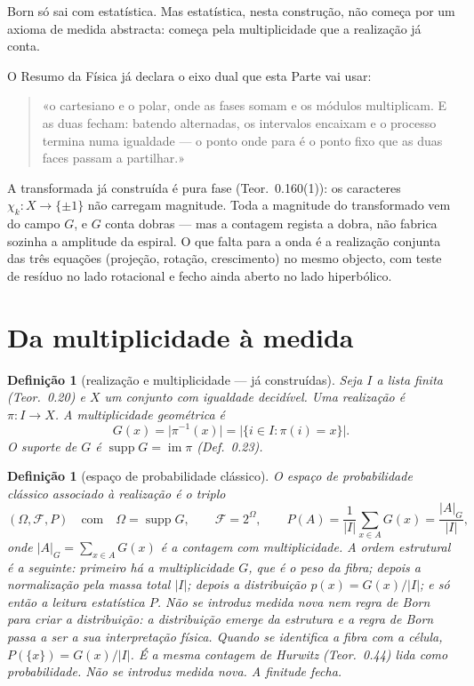 \documentclass[11pt,a4paper]{article}
\newtheorem{definicao}[teorema]{Definição}
\begin{document}
Born só sai com estatística. Mas estatística, nesta construção, não começa por um axioma
de medida abstracta: começa pela multiplicidade que a realização já conta.

O Resumo da Física já declara o eixo dual que esta Parte vai usar:

\begin{quote}
\small
«o cartesiano e o polar, onde as fases somam e os módulos multiplicam.
E as duas fecham: batendo alternadas, os intervalos encaixam e o processo termina
numa igualdade --- o ponto onde para é o ponto fixo que as duas faces passam a partilhar.»
\end{quote}

A transformada já construída é pura fase (Teor.~0.160(1)): os caracteres $\chi_k:X\to\{\pm1\}$
não carregam magnitude. Toda a magnitude do transformado vem do campo $G$, e $G$ conta
dobras --- mas a contagem regista a dobra, não fabrica sozinha a amplitude da espiral.
O que falta para a onda é a realização conjunta das três equações
(projeção, rotação, crescimento) no mesmo objecto, com teste de resíduo no lado rotacional
e fecho ainda aberto no lado hiperbólico.

\section{Da multiplicidade à medida}

\begin{definicao}[realização e multiplicidade --- já construídas]
\label{def:realizacao}
Seja $I$ a lista finita (Teor.~0.20) e $X$ um conjunto com igualdade decidível.
Uma realização é $\pi:I\to X$. A multiplicidade geométrica é
\[
G(x)=\bigl|\pi^{-1}(x)\bigr|=\bigl|\{i\in I:\pi(i)=x\}\bigr|.
\]
O suporte de $G$ é $\operatorname{supp}G=\operatorname{im}\pi$ (Def.~0.23).
\end{definicao}

\begin{definicao}[espaço de probabilidade clássico]
\label{def:espaco-prob}
O espaço de probabilidade clássico associado à realização é o triplo
\[
(\Omega,\mathcal{F},P)
\quad\text{com}\quad
\Omega=\operatorname{supp}G,\qquad
\mathcal{F}=2^\Omega,\qquad
P(A)=\frac{1}{|I|}\sum_{x\in A}G(x)=\frac{|A|_G}{|I|},
\]
onde $|A|_G=\sum_{x\in A}G(x)$ é a contagem com multiplicidade.
A ordem estrutural é a seguinte: primeiro há a multiplicidade $G$, que é o peso da fibra; depois a normalização pela massa total $|I|$; depois a distribuição $p(x)=G(x)/|I|$; e só então a leitura estatística $P$. Não se introduz medida nova nem regra de Born para criar a distribuição: a distribuição emerge da estrutura e a regra de Born passa a ser a sua interpretação física. Quando se identifica a fibra com a célula, $P(\{x\})=G(x)/|I|$.
É a mesma contagem de Hurwitz (Teor.~0.44) lida como probabilidade.
Não se introduz medida nova. A finitude fecha.
\end{definicao}
\end{document}
